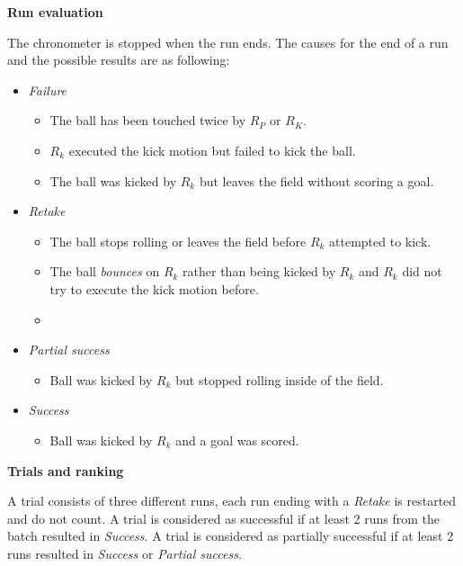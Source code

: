 {\bfseries Run evaluation}

\smallskip

The chronometer is stopped when the run ends. The causes for the end of a run and
the possible results are as following:
\begin{itemize}
\item \textit{Failure}
  \begin{itemize}
  \item The ball has been touched twice by $R_P$ or $R_K$.
  \item $R_k$ executed the kick motion but failed to kick the ball.
  \item The ball was kicked by $R_k$ but leaves the field without scoring a goal.
  \end{itemize}
\item \textit{Retake}
  \begin{itemize}
    \item The ball stops rolling or leaves the field before $R_k$ attempted to kick.
    \item The ball \emph{bounces} on $R_k$ rather than being kicked by $R_k$ and
          $R_k$ did not try to execute the kick motion before.
    \item {}
  \end{itemize}
\item \textit{Partial success}
  \begin{itemize}
    \item Ball was kicked by $R_k$ but stopped rolling inside of the field.
  \end{itemize}
\item \textit{Success}
  \begin{itemize}
    \item Ball was kicked by $R_k$ and a goal was scored.
  \end{itemize}
\end{itemize}

{\bfseries Trials and ranking}

A trial consists of three different runs, each run ending with a \textit{Retake}
is restarted and do not count. A trial is considered as successful if at least 2
runs from the batch resulted in \textit{Success}. A trial is considered as
partially successful if at least 2 runs resulted in \textit{Success} or \textit{Partial success}.

